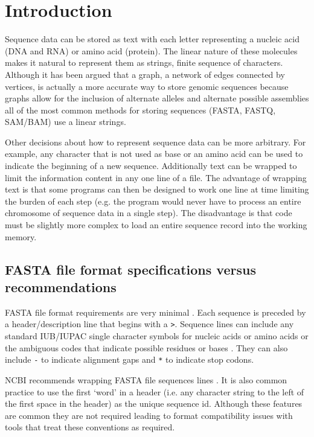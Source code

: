\section{Introduction}

Sequence data can be stored as text with each letter representing a nucleic acid (DNA and RNA) or amino acid (protein). The linear nature of these molecules makes it natural to represent them as strings, finite sequence of characters. Although it has been argued that a graph, a network of edges connected by vertices, is actually a more accurate way to store genomic sequences because graphs allow for the inclusion of alternate alleles and alternate possible assemblies \cite{jaffe2012fastg} all of the most common methods for storing sequences (FASTA, FASTQ, SAM/BAM) use a linear strings.

Other decisions about how to represent sequence data can be more arbitrary. For example, any character that is not used as base or an amino acid can be used to indicate the beginning of a new sequence. Additionally text can be wrapped to limit the information content in any one line of a file. The advantage of wrapping text is that some programs can then be designed to work one line at time limiting the burden of each step (e.g. the program would never have to process an entire chromosome of sequence data in a single step). The disadvantage is that code must be slightly more complex to load an entire sequence record into the working memory.

\subsection{FASTA file format specifications versus recommendations}

FASTA file format requirements are very minimal \cite{FASTAformat}. Each sequence is preceded by a header/description line that begins with a \verb|>|. Sequence lines can include any standard IUB/IUPAC single character symbols for nucleic acids or amino acids or the ambiguous codes that indicate possible residues or bases \cite{comm1970abbreviations}. They can also include \verb|-| to indicate alignment gaps and \verb|*| to indicate stop codons. 

NCBI recommends wrapping FASTA file sequences lines \cite{FASTAformat}. It is also common practice to use the first `word' in a header (i.e. any character string to the left of the first space in the header) as the unique sequence id. Although these features are common they are not required leading to format compatibility issues with tools that treat these conventions as required.

